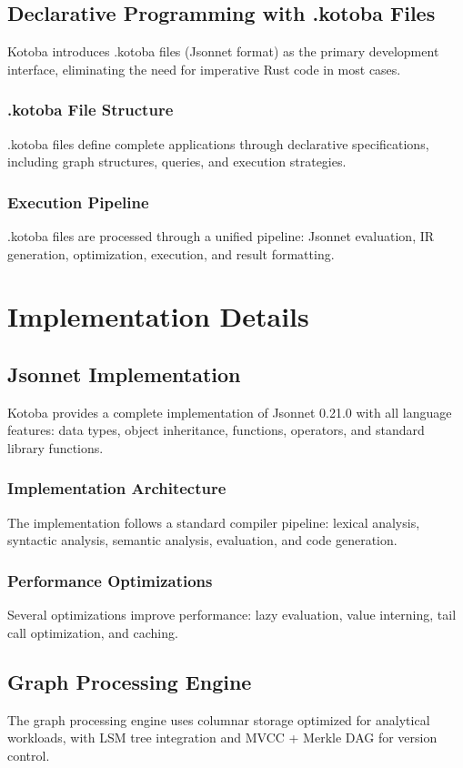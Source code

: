 \documentclass[11pt,a4paper]{article}
\begin{document}
\subsection{Declarative Programming with .kotoba Files}
Kotoba introduces .kotoba files (Jsonnet format) as the primary development interface, eliminating the need for imperative Rust code in most cases.

\subsubsection{.kotoba File Structure}
.kotoba files define complete applications through declarative specifications, including graph structures, queries, and execution strategies.

\subsubsection{Execution Pipeline}
.kotoba files are processed through a unified pipeline: Jsonnet evaluation, IR generation, optimization, execution, and result formatting.

\section{Implementation Details}
\label{sec:implementation}

\subsection{Jsonnet Implementation}
Kotoba provides a complete implementation of Jsonnet 0.21.0 with all language features: data types, object inheritance, functions, operators, and standard library functions.

\subsubsection{Implementation Architecture}
The implementation follows a standard compiler pipeline: lexical analysis, syntactic analysis, semantic analysis, evaluation, and code generation.

\subsubsection{Performance Optimizations}
Several optimizations improve performance: lazy evaluation, value interning, tail call optimization, and caching.

\subsection{Graph Processing Engine}
The graph processing engine uses columnar storage optimized for analytical workloads, with LSM tree integration and MVCC + Merkle DAG for version control.
\end{document}
